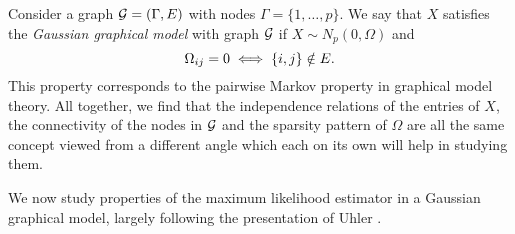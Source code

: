 Consider a graph ${\mathcal{G}} = (\Gamma, E)$ with nodes $\Gamma = \{1, \ldots, p\}$. We say that $X$ satisfies the \textit{Gaussian graphical model} with graph ${\mathcal{G}}$ if $X \sim N_p(0, \Omega)$ and
\begin{equation} \label{eq-ggm}
    \Omega_{i j} = 0 \iff {\left\{i,j\right\}} \notin E.
\end{equation}
This property corresponds to the pairwise Markov property in graphical model theory. All together, we find that the independence relations of the entries of $X$, the connectivity of the nodes in ${\mathcal{G}}$ and the sparsity pattern of $\Omega$ are all the same concept viewed from a different angle which each on its own will help in studying them.

We now study properties of the maximum likelihood estimator in a Gaussian graphical model, largely following the presentation of Uhler \cite[Section 9]{maathuis2018handbook}.

